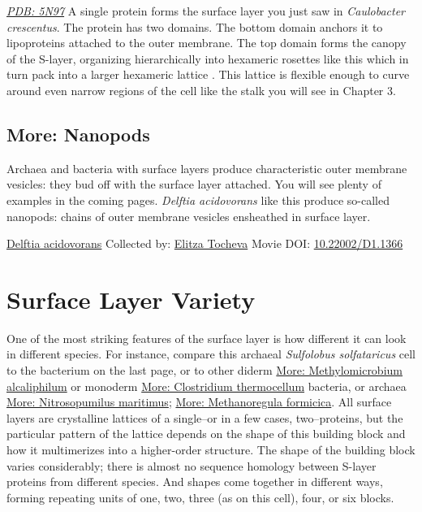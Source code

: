 \documentclass[]{tufte-book}
\begin{document}
\href{http://rcsb.org/structure/5N97}{\emph{PDB: 5N97}}
A single protein forms the surface layer you just saw in \emph{Caulobacter crescentus}. The protein has two domains. The bottom domain anchors it to lipoproteins attached to the outer membrane. The top domain forms the canopy of the S-layer, organizing hierarchically into hexameric rosettes like this which in turn pack into a larger hexameric lattice \citep{bharat2017}. This lattice is flexible enough to curve around even narrow regions of the cell like the stalk you will see in Chapter 3.

\hypertarget{Nanopods}{%
\subsection*{More: Nanopods}\label{Nanopods}}

Archaea and bacteria with surface layers produce characteristic outer membrane vesicles: they bud off with the surface layer attached. You will see plenty of examples in the coming pages. \emph{Delftia acidovorans} like this produce so-called nanopods: chains of outer membrane vesicles ensheathed in surface layer.



\hypertarget{htmlwidget-61ff01f0b93654928101}{}

\label{fig:2-6a}\protect\hyperlink{tree}{Delftia acidovorans} Collected by: \protect\hyperlink{elitza_tocheva}{Elitza Tocheva} Movie DOI: \href{https://doi.org/10.22002/D1.1366}{10.22002/D1.1366}

\hypertarget{surface-layer-variety}{%
\section{Surface Layer Variety}\label{surface-layer-variety}}

One of the most striking features of the surface layer is how different it can look in different species. For instance, compare this archaeal \emph{Sulfolobus solfataricus} cell to the bacterium on the last page, or to other diderm \protect\hyperlink{Methylomicrobium_alcaliphilum}{More: Methylomicrobium alcaliphilum} or monoderm \protect\hyperlink{Clostridium_thermocellum}{More: Clostridium thermocellum} bacteria, or archaea \protect\hyperlink{Nitrosopumilus_maritimus}{More: Nitrosopumilus maritimus}; \protect\hyperlink{Methanoregula_formicica}{More: Methanoregula formicica}. All surface layers are crystalline lattices of a single--or in a few cases, two--proteins, but the particular pattern of the lattice depends on the shape of this building block and how it multimerizes into a higher-order structure. The shape of the building block varies considerably; there is almost no sequence homology between S-layer proteins from different species. And shapes come together in different ways, forming repeating units of one, two, three (as on this cell), four, or six blocks.
\end{document}
